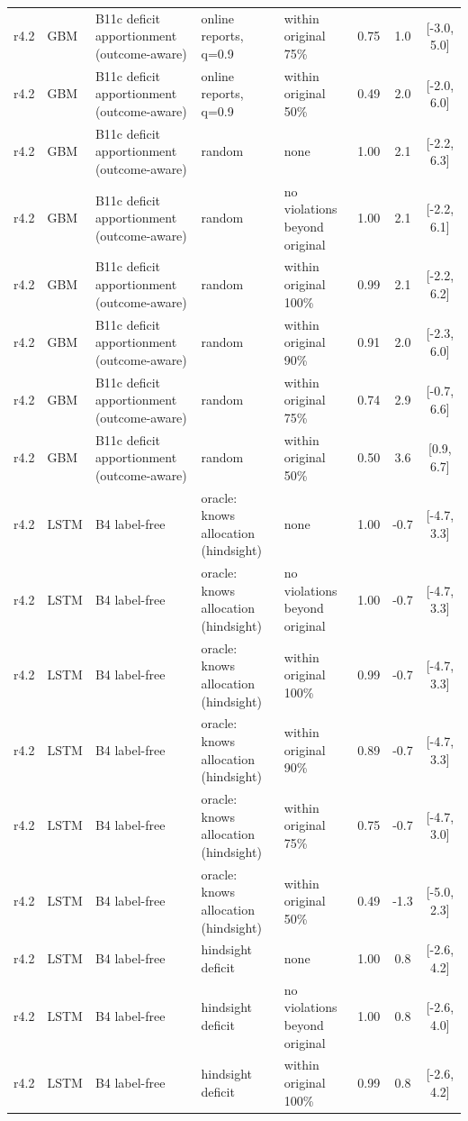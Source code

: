 \begin{longtable}{lllp{4.2cm}p{3.4cm}ccc}
r4.2 & GBM & B11c deficit apportionment (outcome-aware) & online reports, q=0.9 & within original 75\% & 0.75 & 1.0 & [-3.0, 5.0] \\
r4.2 & GBM & B11c deficit apportionment (outcome-aware) & online reports, q=0.9 & within original 50\% & 0.49 & 2.0 & [-2.0, 6.0] \\
r4.2 & GBM & B11c deficit apportionment (outcome-aware) & random & none & 1.00 & 2.1 & [-2.2, 6.3] \\
r4.2 & GBM & B11c deficit apportionment (outcome-aware) & random & no violations beyond original & 1.00 & 2.1 & [-2.2, 6.1] \\
r4.2 & GBM & B11c deficit apportionment (outcome-aware) & random & within original 100\% & 0.99 & 2.1 & [-2.2, 6.2] \\
r4.2 & GBM & B11c deficit apportionment (outcome-aware) & random & within original 90\% & 0.91 & 2.0 & [-2.3, 6.0] \\
r4.2 & GBM & B11c deficit apportionment (outcome-aware) & random & within original 75\% & 0.74 & 2.9 & [-0.7, 6.6] \\
r4.2 & GBM & B11c deficit apportionment (outcome-aware) & random & within original 50\% & 0.50 & 3.6 & [0.9, 6.7] \\
r4.2 & LSTM & B4 label-free & oracle: knows allocation (hindsight) & none & 1.00 & -0.7 & [-4.7, 3.3] \\
r4.2 & LSTM & B4 label-free & oracle: knows allocation (hindsight) & no violations beyond original & 1.00 & -0.7 & [-4.7, 3.3] \\
r4.2 & LSTM & B4 label-free & oracle: knows allocation (hindsight) & within original 100\% & 0.99 & -0.7 & [-4.7, 3.3] \\
r4.2 & LSTM & B4 label-free & oracle: knows allocation (hindsight) & within original 90\% & 0.89 & -0.7 & [-4.7, 3.3] \\
r4.2 & LSTM & B4 label-free & oracle: knows allocation (hindsight) & within original 75\% & 0.75 & -0.7 & [-4.7, 3.0] \\
r4.2 & LSTM & B4 label-free & oracle: knows allocation (hindsight) & within original 50\% & 0.49 & -1.3 & [-5.0, 2.3] \\
r4.2 & LSTM & B4 label-free & hindsight deficit & none & 1.00 & 0.8 & [-2.6, 4.2] \\
r4.2 & LSTM & B4 label-free & hindsight deficit & no violations beyond original & 1.00 & 0.8 & [-2.6, 4.0] \\
r4.2 & LSTM & B4 label-free & hindsight deficit & within original 100\% & 0.99 & 0.8 & [-2.6, 4.2] \\

\end{longtable}
